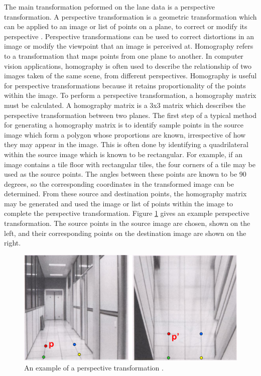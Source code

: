 \documentclass[titlepage,draft]{article}
\begin{document}
The main transformation peformed on the lane data is a perspective transformation. A perspective transformation is a geometric transformation which can be applied to an image or list of points on a plane, to correct or modify its perspective \cite{CarletonHomography}. Perspective transformations can be used to correct distortions in an image or modify the viewpoint that an image is perceived at.
Homography refers to a transformation that maps points from one plane to another. In computer vision applications, homography is often used to describe the relationship of two images taken of the same scene, from different perspectives. Homography is useful for perspective transformations because it retains proportionality of the points within the image. To perform a perspective transformation, a homography matrix must be calculated. A homography matrix is a 3x3 matrix which describes the perspective transformation between two planes.
The first step of a typical method for generating a homography matrix is to identify sample points in the source image which form a polygon whose proportions are known, irrespective of how they may appear in the image. This is often done by identifying a quadrilateral within the source image which is known to be rectangular. For example, if an image contains a tile floor with rectangular tiles, the four corners of a tile may be used as the source points. The angles between these points are known to be 90 degrees, so the corresponding coordinates in the transformed image can be determined. From these source and destination points, the homography matrix may be generated and used the image or list of points within the image to complete the perspective transformation. Figure \ref{CarletonTransform} gives an example perspective transformation. The source points in the source image are chosen, shown on the left, and their corresponding points on the destination image are shown on the right.
\begin{figure}
	\centering
	\includegraphics[width=6in]{transform_carleton.png}
	\caption{An example of a perspective transformation \cite{CarletonHomography}.}
	\label{CarletonTransform}
\end{figure}
\end{document}

